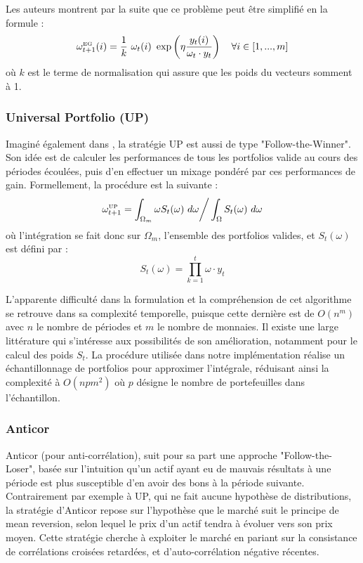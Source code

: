 \documentclass[a4paper, 10pt]{article}
\begin{document}
Les auteurs montrent par la suite que ce problème peut être simplifié en la formule :
\begin{equation}
    \omega_{t+1}^{\text{\tiny EG}}(i) = \frac{1}{k} \ \omega_{t}(i) \ \exp \left(\eta \frac{y_{t}(i)}{\omega_{t} \cdot y_t} \right) \quad \forall i \in [1, ..., m]
\end{equation}
où $k$ est le terme de normalisation qui assure que les poids du vecteurs somment à 1.

\subsubsection{Universal Portfolio (UP)}
\label{sec:theorie_etude_up}

Imaginé également dans \cite{Cover1991}, la stratégie UP est aussi de type "Follow-the-Winner". Son idée est de calculer les performances de tous les portfolios valide au cours des périodes écoulées, puis d'en effectuer un mixage pondéré par ces performances de gain. Formellement, la procédure est la suivante :
\begin{equation}
    \omega_{t+1}^{\text{\tiny UP}} = \int_{\Omega_m} \omega S_t(\omega) \ d\omega \bigg/ \int_{\Omega} S_t(\omega) \ d\omega
\end{equation}
où l'intégration se fait donc sur $\Omega_m$, l'ensemble des portfolios valides, et $S_t(\omega)$ est défini par :
\begin{equation}
    S_t(\omega) = \prod_{k=1}^{t} \omega \cdot y_t
\end{equation}

L'apparente difficulté dans la formulation et la compréhension de cet algorithme se retrouve dans sa complexité temporelle, puisque cette dernière est de $O(n^m)$ avec $n$ le nombre de périodes et $m$ le nombre de monnaies. Il existe une large littérature qui s'intéresse aux possibilités de son amélioration, notamment pour le calcul des poids $S_t$. La procédure utilisée dans notre implémentation réalise un échantillonnage de portfolios pour approximer l’intégrale, réduisant ainsi la complexité à $O(npm^2)$ où $p$ désigne le nombre de portefeuilles dans l’échantillon.

\subsubsection{Anticor}
\label{sec:theorie_etude_anticor}

Anticor (pour anti-corrélation), suit pour sa part une approche "Follow-the-Loser", basée sur l'intuition qu'un actif ayant eu de mauvais résultats à une période est plus susceptible d'en avoir des bons à la période suivante. Contrairement par exemple à UP, qui ne fait aucune hypothèse de distributions, la stratégie d'Anticor repose sur l'hypothèse que le marché suit le principe de mean reversion, selon lequel le prix d'un actif tendra à évoluer vers son prix moyen. Cette stratégie cherche à exploiter le marché en pariant sur la consistance de corrélations croisées retardées, et d'auto-corrélation négative récentes.
\end{document}
